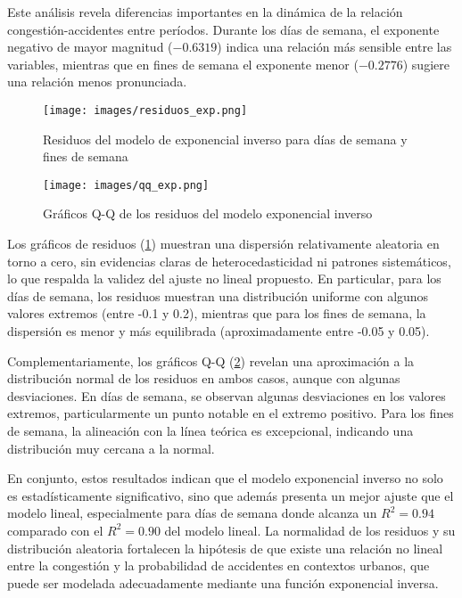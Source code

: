 \documentclass[12pt]{article}
\begin{document}
Este análisis revela diferencias importantes en la dinámica de la relación congestión-accidentes entre períodos. Durante los días de semana, el exponente negativo de mayor magnitud ($-0.6319$) indica una relación más sensible entre las variables, mientras que en fines de semana el exponente menor ($-0.2776$) sugiere una relación menos pronunciada.

\begin{figure}[H]
\centering
\texttt{[image: images/residuos\_exp.png]}
\caption{Residuos del modelo de exponencial inverso para días de semana y fines de semana}
\label{fig:resid_exp}
\end{figure}

\begin{figure}[H]
\centering
\texttt{[image: images/qq\_exp.png]}
\caption{Gráficos Q-Q de los residuos del modelo exponencial inverso}
\label{fig:qq_exp}
\end{figure}

Los gráficos de residuos (\cref{fig:resid_exp}) muestran una dispersión relativamente aleatoria en torno a cero, sin evidencias claras de heterocedasticidad ni patrones sistemáticos, lo que respalda la validez del ajuste no lineal propuesto. En particular, para los días de semana, los residuos muestran una distribución uniforme con algunos valores extremos (entre -0.1 y 0.2), mientras que para los fines de semana, la dispersión es menor y más equilibrada (aproximadamente entre -0.05 y 0.05).

Complementariamente, los gráficos Q-Q (\cref{fig:qq_exp}) revelan una aproximación a la distribución normal de los residuos en ambos casos, aunque con algunas desviaciones. En días de semana, se observan algunas desviaciones en los valores extremos, particularmente un punto notable en el extremo positivo. Para los fines de semana, la alineación con la línea teórica es excepcional, indicando una distribución muy cercana a la normal.

En conjunto, estos resultados indican que el modelo exponencial inverso no solo es estadísticamente significativo, sino que además presenta un mejor ajuste que el modelo lineal, especialmente para días de semana donde alcanza un $R^2 = 0.94$ comparado con el $R^2 = 0.90$ del modelo lineal. La normalidad de los residuos y su distribución aleatoria fortalecen la hipótesis de que existe una relación no lineal entre la congestión y la probabilidad de accidentes en contextos urbanos, que puede ser modelada adecuadamente mediante una función exponencial inversa.
\end{document}
